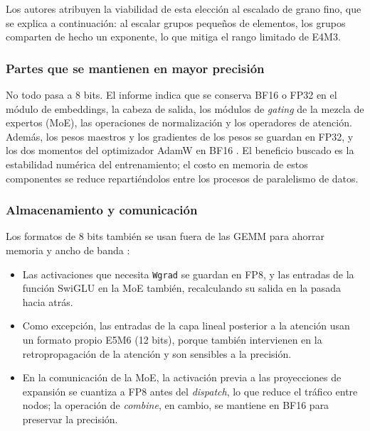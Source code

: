 \documentclass{article}
\begin{document}
        Los autores atribuyen la viabilidad de esta elección al escalado
        de grano fino, que se explica a continuación: al escalar grupos
        pequeños de elementos, los grupos comparten de hecho un exponente,
        lo que mitiga el rango limitado de E4M3.

      \subsubsection{Partes que se mantienen en mayor precisión}

        No todo pasa a 8 bits. El informe indica que se conserva BF16 o
        FP32 en el módulo de embeddings, la cabeza de salida, los módulos
        de \emph{gating} de la mezcla de expertos (MoE), las operaciones de
        normalización y los operadores de atención. Además, los pesos
        maestros y los gradientes de los pesos se guardan en FP32, y los
        dos momentos del optimizador AdamW en BF16 \cite{deepseek2024v3}.
        El beneficio buscado es la estabilidad numérica del entrenamiento;
        el costo en memoria de estos componentes se reduce repartiéndolos
        entre los procesos de paralelismo de datos.

      \subsubsection{Almacenamiento y comunicación}

        Los formatos de 8 bits también se usan fuera de las GEMM para
        ahorrar memoria y ancho de banda \cite{deepseek2024v3}:

        \begin{itemize}
          \item Las activaciones que necesita \texttt{Wgrad} se guardan
            en FP8, y las entradas de la función SwiGLU en la MoE también,
            recalculando su salida en la pasada hacia atrás.
          \item Como excepción, las entradas de la capa lineal posterior a
            la atención usan un formato propio E5M6 (12 bits), porque
            también intervienen en la retropropagación de la atención y son
            sensibles a la precisión.
          \item En la comunicación de la MoE, la activación previa a las
            proyecciones de expansión se cuantiza a FP8 antes del
            \emph{dispatch}, lo que reduce el tráfico entre nodos; la
            operación de \emph{combine}, en cambio, se mantiene en BF16
            para preservar la precisión.
        \end{itemize}
\end{document}
